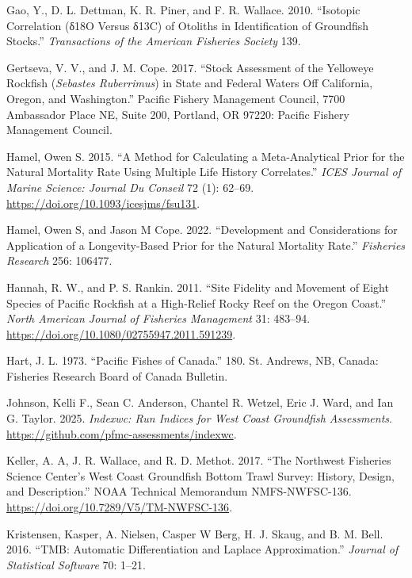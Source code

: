 \documentclass[
]{scrartcl}
\newlength{\cslhangindent}
\newenvironment{CSLReferences}[2] %
 {\begin{list}{}{%
  \setlength{\itemindent}{0pt}
  \setlength{\leftmargin}{0pt}
  \setlength{\parsep}{0pt}
  \ifodd #1
   \setlength{\leftmargin}{\cslhangindent}
   \setlength{\itemindent}{-1\cslhangindent}
  \fi
  \setlength{\itemsep}{#2\baselineskip}}}
 {\end{list}}
\begin{document}
\begin{CSLReferences}{1}{0}
Gao, Y., D. L. Dettman, K. R. Piner, and F. R. Wallace. 2010.
{``Isotopic Correlation (δ18O Versus δ13C) of Otoliths in Identification
of Groundfish Stocks.''} \emph{Transactions of the American Fisheries
Society} 139.

Gertseva, V. V., and J. M. Cope. 2017. {``Stock Assessment of the
Yelloweye Rockfish (\emph{{Sebastes} Ruberrimus}) in State and {Federal}
Waters Off {California}, {Oregon}, and {Washington}.''} Pacific Fishery
Management Council, 7700 Ambassador Place NE, Suite 200, Portland, OR
97220: Pacific Fishery Management Council.

Hamel, Owen S. 2015. {``A Method for Calculating a Meta-Analytical Prior
for the Natural Mortality Rate Using Multiple Life History
Correlates.''} \emph{ICES Journal of Marine Science: Journal Du Conseil}
72 (1): 62--69. \url{https://doi.org/10.1093/icesjms/fsu131}.

Hamel, Owen S, and Jason M Cope. 2022. {``Development and Considerations
for Application of a Longevity-Based Prior for the Natural Mortality
Rate.''} \emph{Fisheries Research} 256: 106477.

Hannah, R. W., and P. S. Rankin. 2011. {``Site Fidelity and Movement of
Eight Species of Pacific Rockfish at a High-Relief Rocky Reef on the
Oregon Coast.''} \emph{North American Journal of Fisheries Management}
31: 483--94. \url{https://doi.org/10.1080/02755947.2011.591239}.

Hart, J. L. 1973. {``Pacific Fishes of Canada.''} 180. St. Andrews, NB,
Canada: Fisheries Research Board of Canada Bulletin.

Johnson, Kelli F., Sean C. Anderson, Chantel R. Wetzel, Eric J. Ward,
and Ian G. Taylor. 2025. \emph{Indexwc: Run Indices for West Coast
Groundfish Assessments}.
\url{https://github.com/pfmc-assessments/indexwc}.

Keller, A. A, J. R. Wallace, and R. D. Methot. 2017. {``The Northwest
Fisheries Science Center's West Coast Groundfish Bottom Trawl Survey:
History, Design, and Description.''} NOAA Technical Memorandum
NMFS-NWFSC-136. \url{https://doi.org/10.7289/V5/TM-NWFSC-136}.

Kristensen, Kasper, A. Nielsen, Casper W Berg, H. J. Skaug, and B. M.
Bell. 2016. {``{TMB}: {Automatic} {Differentiation} and {Laplace}
{Approximation}.''} \emph{Journal of Statistical Software} 70: 1--21.


\end{CSLReferences}
\end{document}
